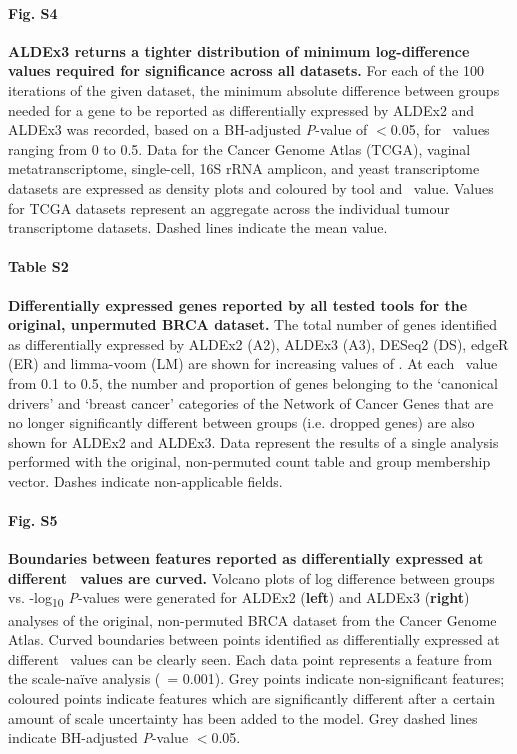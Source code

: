 \documentclass[10pt,letterpaper]{article}
\begin{document}
\paragraph*{Fig. S4}
\label{fig:supFigDensity}
\textbf{ALDEx3 returns a tighter distribution of minimum log-difference values required for significance across all datasets.} For each of the 100 iterations of the given dataset, the minimum absolute difference between groups needed for a gene to be reported as differentially expressed by ALDEx2 and ALDEx3 was recorded, based on a BH-adjusted \textit{P}-value of $<$0.05, for \textgamma~values ranging from 0 to 0.5. Data for the Cancer Genome Atlas (TCGA), vaginal metatranscriptome, single-cell, 16S rRNA amplicon, and yeast transcriptome datasets are expressed as density plots and coloured by tool and \textgamma~value. Values for TCGA datasets represent an aggregate across the individual tumour transcriptome datasets. Dashed lines indicate the mean value.

\paragraph*{Table S2}
\label{tab:sigGenesReal}
\textbf{Differentially expressed genes reported by all tested tools for the original, unpermuted BRCA dataset.} The total number of genes identified as differentially expressed by ALDEx2 (A2), ALDEx3 (A3), DESeq2 (DS), edgeR (ER) and limma-voom (LM) are shown for increasing values of \textgamma. At each \textgamma~value from 0.1 to 0.5, the number and proportion of genes belonging to the `canonical drivers' and `breast cancer' categories of the Network of Cancer Genes \cite{repana_network_2019} that are no longer significantly different between groups (i.e. dropped genes) are also shown for ALDEx2 and ALDEx3. Data represent the results of a single analysis performed with the original, non-permuted count table and group membership vector. Dashes indicate non-applicable fields. 

\paragraph*{Fig. S5}
\label{fig:supFigEffect}
\textbf{Boundaries between features reported as differentially expressed at different \textgamma~values are curved.} Volcano plots of log difference between groups vs. -log\textsubscript{10} \textit{P}-values were generated for ALDEx2 (\textbf{left}) and ALDEx3 (\textbf{right}) analyses of the original, non-permuted BRCA dataset from the Cancer Genome Atlas. Curved boundaries between points identified as differentially expressed at different \textgamma~values can be clearly seen. Each data point represents a feature from the scale-na\"ive analysis (\textgamma~= 0.001). Grey points indicate non-significant features; coloured points indicate features which are significantly different after a certain amount of scale uncertainty has been added to the model. Grey dashed lines indicate BH-adjusted \textit{P}-value $<$0.05.
\end{document}
